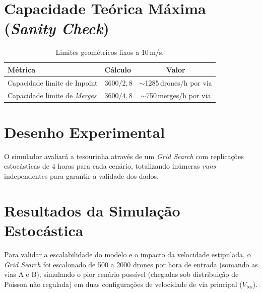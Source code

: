 \documentclass[12pt,a4paper]{article}
\begin{document}
\section{Capacidade Teórica Máxima (\textit{Sanity Check})}
\label{sec:sanity_check}

\begin{table}[H]
\centering
\caption{Limites geométricos fixos a 10\,m/s.}
\label{tab:capacidade}
\begin{tabular}{@{}llc@{}}
\toprule
\textbf{Métrica} & \textbf{Cálculo} & \textbf{Valor} \\
\midrule
Capacidade limite de Inpoint          & $3600 / 2{,}8$  & $\sim$1285\,drones/h por via \\
Capacidade limite de \textit{Merges}  & $3600 / 4{,}8$  & $\sim$750\,merges/h por via \\
\bottomrule
\end{tabular}
\end{table}

\section{Desenho Experimental}
\label{sec:experimental}

O simulador avaliará a tesourinha através de um \textit{Grid Search} com replicações estocásticas de 4 horas para cada cenário, totalizando inúmeras \textit{runs} independentes para garantir a validade dos dados.

\section{Resultados da Simulação Estocástica}
\label{sec:resultados}

Para validar a escalabilidade do modelo e o impacto da velocidade estipulada, o \textit{Grid Search} foi escalonado de 500 a 2000 drones por hora de entrada (somando as vias A e B), simulando o pior cenário possível (chegadas sob distribuição de Poisson não regulada) em duas configurações de velocidade de via principal ($V_{\text{tes}}$).
\end{document}
